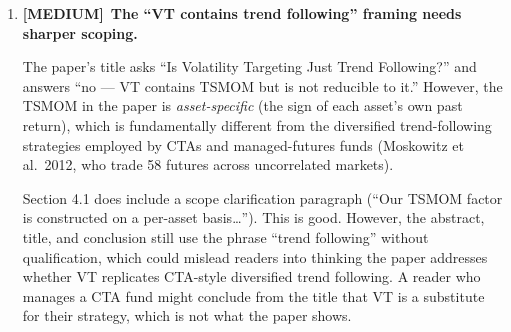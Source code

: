 \documentclass[12pt,a4paper]{article}
\newcommand{\MEDIUM}{\textcolor{medsev}{\textbf{[MEDIUM]}}}
\begin{document}
\begin{enumerate}[label=\textbf{A.\arabic*}]
\textbf{More importantly:} The paper's thesis (``VT's primary value is MDD insurance, not alpha'') is \textit{strengthened} by K687/K697/K688. The paper should cite these findings (as Lai, 2026b or as internal robustness checks) because they provide the strongest possible support for the core argument.

\textbf{Recommendation:}
\begin{enumerate}
\item Add a paragraph in Section 4.1 or 4.3 explicitly stating that separate lag-corrected analysis (K687) confirms VT does not generate Sharpe alpha, reinforcing the insurance interpretation.
\item Cite K697's direction-vs.-magnitude finding as evidence for the VIX-level mechanism (Section 4.2).
\item Use K688's CRRA utility result to provide a formal framework for the Cederburg rebuttal (Section 4.1): state the breakeven $\gamma \approx 5$ rather than leaving it as ``may underweight.''
\item Reconcile the Table~3 Sharpe numbers with K687 --- explain whether the apparent Sharpe improvement in Table~3 is statistically insignificant (which it is: $t = 1.50$) and emphasize that this \textit{supports} the paper's thesis.
\end{enumerate}


\item \MEDIUM\ \textbf{The ``VT contains trend following'' framing needs sharper scoping.}

The paper's title asks ``Is Volatility Targeting Just Trend Following?'' and answers ``no --- VT contains TSMOM but is not reducible to it.'' However, the TSMOM in the paper is \textit{asset-specific} (the sign of each asset's own past return), which is fundamentally different from the diversified trend-following strategies employed by CTAs and managed-futures funds (Moskowitz et al.\ 2012, who trade 58 futures across uncorrelated markets).

Section 4.1 does include a scope clarification paragraph (``Our TSMOM factor is constructed on a per-asset basis\ldots''). This is good. However, the abstract, title, and conclusion still use the phrase ``trend following'' without qualification, which could mislead readers into thinking the paper addresses whether VT replicates CTA-style diversified trend following. A reader who manages a CTA fund might conclude from the title that VT is a substitute for their strategy, which is not what the paper shows.


\end{enumerate}
\end{document}

